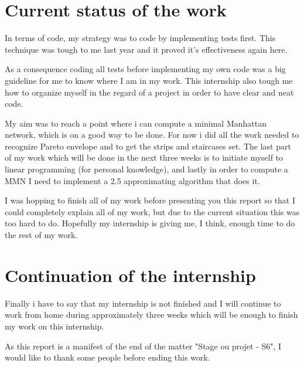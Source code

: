 \section{Current status of the work}
In terms of code, my strategy was to code by implementing tests first. This technique was tough to me last year and it proved it's effectiveness again here.

As a consequence coding all tests before implementing my own code was a big guideline for me to know where I am in my work. This internship also tough me how to organize myself in the regard of a project in order to have clear and neat code.\newline 

My aim was to reach a point where i can compute a minimal Manhattan network, which is on a good way to be done. For now i did all the work needed to recognize Pareto envelope and to get the strips and staircases set.
The last part of my work which will be done in the next three weeks is to initiate myself to linear programming (for personal knowledge), and lastly in order to compute a MMN I need to implement a 2.5 approximating algorithm that does it.\newline

I was hopping to finish all of my work before presenting you this report so that I could completely explain all of my work, but due to the current situation this was too hard to do. Hopefully my internship is giving me, I think, enough time to do the rest of my work.

\section{Continuation of the internship}
Finally i have to say that my internship is not finished and I will continue to work from home during approximately three weeks which will be enough to finish my work on this internship.

As this report is a manifest of the end of the matter "Stage ou projet - S6", I would like to thank some people before ending this work. 